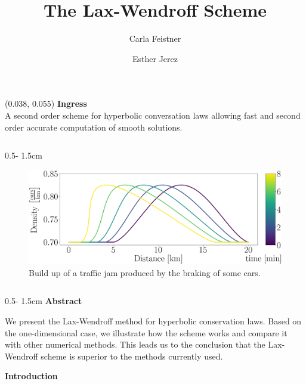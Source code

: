 \documentclass{uibposter}
\title{The Lax-Wendroff Scheme}
\author
{%
    Carla Feistner 
    \and
    Esther Jerez
}
\institute
{
    Department of Mathematics -- University of Bergen
}
\begin{document}
\begin{textblock}{0.5}(0.038, 0.055)
    \color{white}
    \sffamily
    \textbf{Ingress}
    \\
A second order scheme for hyperbolic conversation laws allowing fast and second order accurate computation of smooth solutions. 
\end{textblock}

\begin{frame}[fragile]

\begin{columns}
\begin{column}{0.5\textwidth - 1.5cm}
    \begin{figure}[h]
    \includegraphics[width=\textwidth]{fig/traffic_motivation_laxW_continous.png} \caption{Build up of a traffic jam produced by the braking of some cars.} \label{img:traffic_flow_motivation}	
    \end{figure}
    \vspace{0.5cm}

\begin{column}{0.5\textwidth - 1.5cm}
\textbf{Abstract}
\vspace{0.5cm}

{\fontsize{40}{15}\selectfont
	We present the Lax-Wendroff method for hyperbolic conservation laws. Based on the one-dimensional case, we illustrate how the scheme works and compare it with other numerical methods. This leads us to the conclusion that the Lax-Wendroff scheme is superior to the methods currently used.}

\vspace{0.5cm}
\textbf{Introduction}
\vspace{0.5cm}


\end{column}
\end{column}
\end{columns}
\end{frame}
\end{document}

